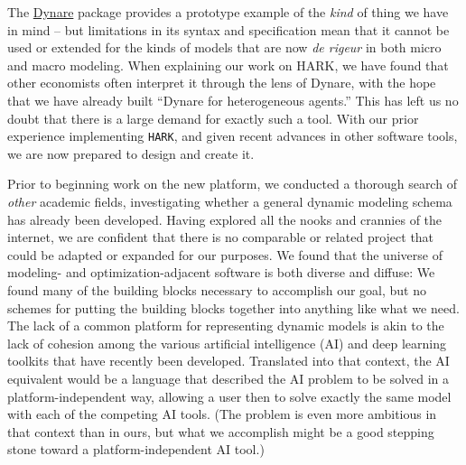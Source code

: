 \documentclass[11pt,pdftex,letterpaper]{article}
\begin{document}


The \href{https://www.dynare.org/}{Dynare} package provides a prototype example of the \textit{kind} of thing we have in mind -- but limitations in its syntax and specification mean that it cannot be used or extended for the kinds of models that are now \textit{de rigeur} in both micro and macro modeling.  When explaining our work on HARK, we have found that other economists often interpret it through the lens of Dynare, with the hope that we have already built ``Dynare for heterogeneous agents.'' This has left us no doubt that there is a large demand for exactly such a tool. With our prior experience implementing \texttt{HARK}, and given recent advances in other software tools, we are now prepared to design and create it.

Prior to beginning work on the new platform, we conducted a thorough search of \textit{other} academic fields, investigating whether a general dynamic modeling schema has already been developed. Having explored all the nooks and crannies of the internet, we are confident that there is no comparable or related project that could be adapted or expanded for our purposes. We found that the universe of modeling- and optimization-adjacent software is both diverse and diffuse: We found many of the building blocks necessary to accomplish our goal, but no schemes for putting the building blocks together into anything like what we need. The lack of a common platform for representing dynamic models is akin to the lack of cohesion among the various artificial intelligence (AI) and deep learning toolkits that have recently been developed. Translated into that context, the AI equivalent would be a language that described the AI problem to be solved in a platform-independent way, allowing a user then to solve exactly the same model with each of the competing AI tools.  (The problem is even more ambitious in that context than in ours, but what we accomplish might be a good stepping stone toward a platform-independent AI tool.)

\end{document}
